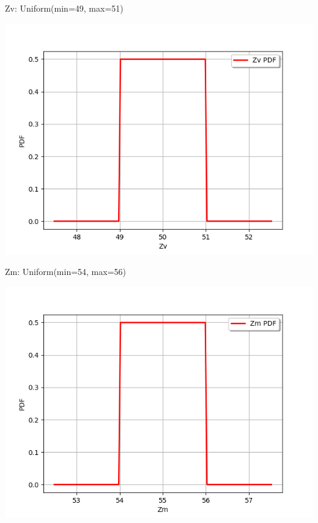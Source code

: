 \documentclass[aspectratio=169]{beamer}
\begin{document}
\begin{frame}[containsverbatim]
\begin{minipage}[t]{0.5\textwidth}
Zv: Uniform(min=49, max=51)

    \includegraphics[width=.45\textwidth]{figures/Zv.png}
    
\end{minipage}%
\begin{minipage}[t]{0.5\textwidth}

Zm: Uniform(min=54, max=56)

    \includegraphics[width=.45\textwidth]{figures/Zm.png}
    
\end{minipage}%

\end{frame}


\end{document}
